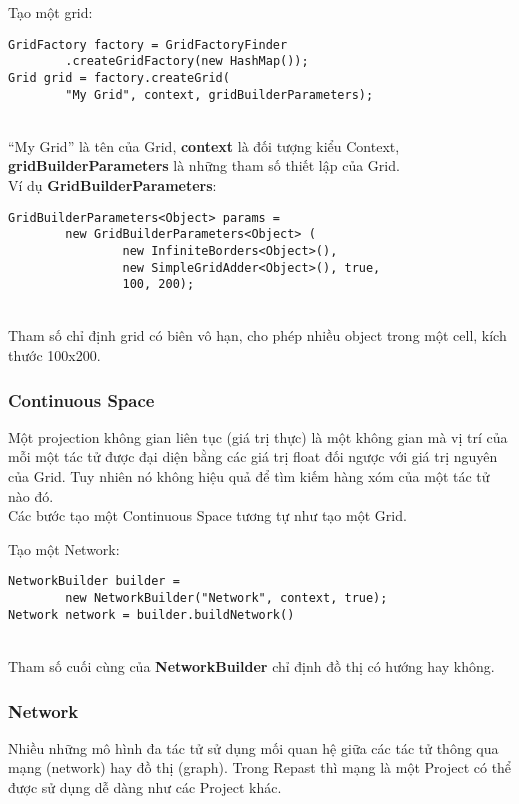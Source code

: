 \documentclass[../report.tex]{subfiles}
\begin{document}
\noindent Tạo một grid: \\
\HRule
\begin{lstlisting}
GridFactory factory = GridFactoryFinder
        .createGridFactory(new HashMap());
Grid grid = factory.createGrid(
        "My Grid", context, gridBuilderParameters);
\end{lstlisting}
\HRule \\
``My Grid'' là tên của Grid, \textbf{context} là đối tượng kiểu Context, 
\textbf{gridBuilderParameters} là những tham số thiết lập của Grid. \\
Ví dụ \textbf{GridBuilderParameters}: \\
\HRule
\begin{lstlisting}
GridBuilderParameters<Object> params = 
        new GridBuilderParameters<Object> (
                new InfiniteBorders<Object>(),
                new SimpleGridAdder<Object>(), true,
                100, 200);
\end{lstlisting}
\HRule \\
Tham số chỉ định grid có biên vô hạn, cho phép nhiều object trong một cell, kích thước 100x200. 

\subsubsection{Continuous Space}
Một projection không gian liên tục (giá trị thực) là một không gian mà vị trí của mỗi một tác tử được đại diện 
bằng các giá trị float đối ngược với giá trị nguyên của Grid. Tuy nhiên nó không hiệu quả để tìm kiếm hàng xóm của 
một tác tử nào đó.  \\
Các bước tạo một Continuous Space tương tự như tạo một Grid. 

\noindent Tạo một Network: \\
\HRule
\begin{lstlisting}
NetworkBuilder builder = 
        new NetworkBuilder("Network", context, true);
Network network = builder.buildNetwork()
\end{lstlisting}
\HRule \\
Tham số cuối cùng của \textbf{NetworkBuilder} chỉ định đồ thị có hướng hay không. 

\subsubsection{Network}
Nhiều những mô hình đa tác tử sử dụng mối quan hệ giữa các tác tử thông qua mạng (network) hay đồ thị (graph). 
Trong Repast thì mạng là một Project có thể được sử dụng dễ dàng như các Project khác. 
\end{document}
